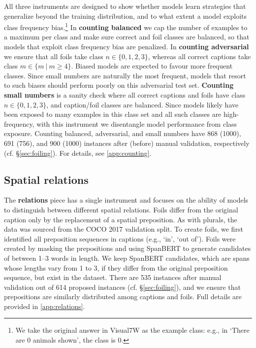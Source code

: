 \documentclass[11pt]{article}
\newcommand\given[1][]{\:#1\vert\:}
\begin{document}
All three instruments are designed to show whether models learn strategies that generalize beyond the training distribution, and to what extent a model exploits class frequency bias.\footnote{We take the original answer in Visual7W as the example class: e.g., in `There are 0 animals shown', the class is 0.}
In {\bf counting balanced} we cap the number of examples to a maximum per class and make sure correct and foil classes are balanced, so that models that exploit class frequency bias are penalized.
In {\bf counting adversarial} we ensure that all foils take class $n \in \{0,1,2,3\}$, whereas all correct captions take class $m \in \{m \given m \geq 4\}$. Biased models are expected to favour more frequent classes.
Since small numbers are naturally the most frequent, models that resort to such biases should perform poorly on this 
adversarial test set.
{\bf Counting small numbers} is a sanity check where all correct captions and foils have class $n \in \{0,1,2,3\}$, and caption/foil classes are balanced. Since models likely have been exposed to many examples in this class set and all such classes are high-frequency, with this instrument we disentangle model performance from class exposure.
Counting balanced, adversarial, and small numbers have 868 (1000), 691 (756), and 900 (1000) instances after (before) manual validation, respectively (cf. \S \ref{sec:foiling}).
For details, see \ref{app:counting}.





\subsection{Spatial relations}
The \textbf{relations} piece has a single instrument and focuses on the ability of models to distinguish between different spatial relations. Foils differ from the original caption only by the replacement of a spatial preposition. 
As with plurals, the data
was sourced from the COCO 2017 validation split. To create foils, we first identified all
preposition sequences in captions (e.g., `in', `out of'). Foils were created 
by masking the prepositions and using  SpanBERT \cite{joshi-etal-2020-spanbert} to generate candidates of between 1--3 words in length. 
We keep SpanBERT candidates, which are spans whose lengths vary from 1 to 3, if they differ from the original preposition sequence, but exist in the dataset.
There are 535 instances after manual validation out of 614 proposed instances (cf. \S \ref{sec:foiling}),
and we ensure that prepositions are similarly distributed among captions and foils.
Full details are provided in \ref{app:relations}.
\end{document}
